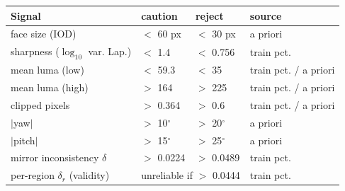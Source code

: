 \begin{tabular}{@{}llll@{}}
\toprule
Signal & caution & reject & source\\
\midrule
face size (IOD) & $<$ 60 px & $<$ 30 px & a priori\\
sharpness ($\log_{10}$ var. Lap.) & $<$ 1.4 & $<$ 0.756 & train pct.\\
mean luma (low) & $<$ 59.3 & $<$ 35 & train pct. / a priori\\
mean luma (high) & $>$ 164 & $>$ 225 & train pct. / a priori\\
clipped pixels & $>$ 0.364 & $>$ 0.6 & train pct. / a priori\\
$|$yaw$|$ & $>$ 10$^\circ$ & $>$ 20$^\circ$ & a priori\\
$|$pitch$|$ & $>$ 15$^\circ$ & $>$ 25$^\circ$ & a priori\\
mirror inconsistency $\delta$ & $>$ 0.0224 & $>$ 0.0489 & train pct.\\
per-region $\delta_r$ (validity) & \multicolumn{2}{l}{unreliable if $>$ 0.0444} & train pct.\\
\bottomrule
\end{tabular}
